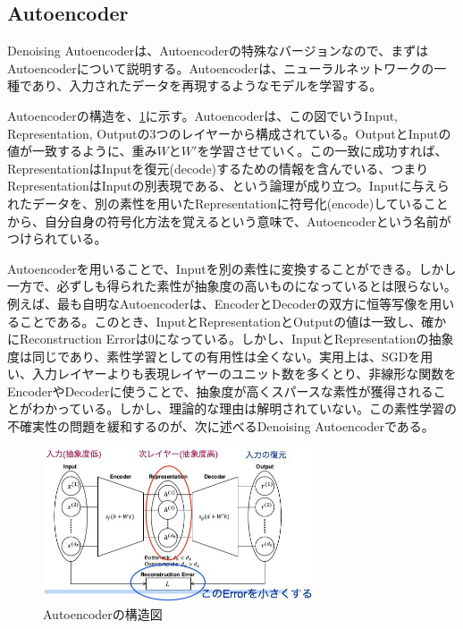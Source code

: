 \subsection{Autoencoder}
Denoising Autoencoderは、Autoencoderの特殊なバージョンなので、まずはAutoencoderについて説明する。Autoencoderは、ニューラルネットワークの一種であり、入力されたデータを再現するようなモデルを学習する。\cite{bourlard1988auto, hinton1994autoencoders, schwenk1995transformation}\par
Autoencoderの構造を、\ref{c3_autoencoder}に示す。Autoencoderは、この図でいうInput, Representation, Outputの3つのレイヤーから構成されている。OutputとInputの値が一致するように、重み$W$と$W'$を学習させていく。この一致に成功すれば、RepresentationはInputを復元(decode)するための情報を含んでいる、つまりRepresentationはInputの別表現である、という論理が成り立つ。Inputに与えられたデータを、別の素性を用いたRepresentationに符号化(encode)していることから、自分自身の符号化方法を覚えるという意味で、Autoencoderという名前がつけられている。\par
Autoencoderを用いることで、Inputを別の素性に変換することができる。しかし一方で、必ずしも得られた素性が抽象度の高いものになっているとは限らない。例えば、最も自明なAutoencoderは、EncoderとDecoderの双方に恒等写像を用いることである。このとき、InputとRepresentationとOutputの値は一致し、確かにReconstruction Errorは0になっている。しかし、InputとRepresentationの抽象度は同じであり、素性学習としての有用性は全くない。実用上は、SGDを用い、入力レイヤーよりも表現レイヤーのユニット数を多くとり、非線形な関数をEncoderやDecoderに使うことで、抽象度が高くスパースな素性が獲得されることがわかっている\cite{bengio2007greedy}\cite{lee2007sparse}。しかし、理論的な理由は解明されていない。この素性学習の不確実性の問題を緩和するのが、次に述べるDenoising Autoencoderである。
\begin{figure}[tbp]
 \begin{center}
  \includegraphics[width=80mm]{img/c3/autoencoder}
 \end{center}
 \caption{Autoencoderの構造図}
 \label{c3_autoencoder}
\end{figure}

